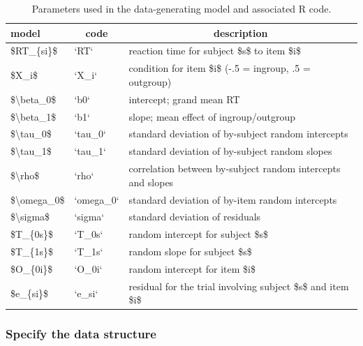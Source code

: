 \documentclass[
  english,
  doc,floatsintext]{apa6}
\begin{document}
\begin{table}[H]

\begin{center}
\begin{threeparttable}

\caption{\label{tab:param-def}Parameters used in the data-generating model and associated R code.}

\begin{tabular}{lll}
\toprule
model & \multicolumn{1}{c}{code} & \multicolumn{1}{c}{description}\\
\midrule
\$RT\_\{si\}\$ & `RT` & reaction time for subject \$s\$ to item \$i\$\\
\$X\_i\$ & `X\_i` & condition for item \$i\$ (-.5 = ingroup, .5 = outgroup)\\
\$\textbackslash{}beta\_0\$ & `b0` & intercept; grand mean RT\\
\$\textbackslash{}beta\_1\$ & `b1` & slope; mean effect of ingroup/outgroup\\
\$\textbackslash{}tau\_0\$ & `tau\_0` & standard deviation of by-subject random intercepts\\
\$\textbackslash{}tau\_1\$ & `tau\_1` & standard deviation of by-subject random slopes\\
\$\textbackslash{}rho\$ & `rho` & correlation between by-subject random intercepts and slopes\\
\$\textbackslash{}omega\_0\$ & `omega\_0` & standard deviation of by-item random intercepts\\
\$\textbackslash{}sigma\$ & `sigma` & standard deviation of residuals\\
\$T\_\{0s\}\$ & `T\_0s` & random intercept for subject \$s\$\\
\$T\_\{1s\}\$ & `T\_1s` & random slope for subject \$s\$\\
\$O\_\{0i\}\$ & `O\_0i` & random intercept for item \$i\$\\
\$e\_\{si\}\$ & `e\_si` & residual for the trial involving subject \$s\$ and item \$i\$\\
\bottomrule
\end{tabular}

\end{threeparttable}
\end{center}

\end{table}

\hypertarget{specify-the-data-structure}{%
\subsubsection{Specify the data structure}\label{specify-the-data-structure}}
\end{document}
